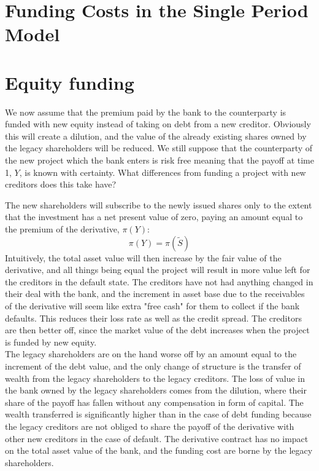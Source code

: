 \documentclass[../main.tex]{subfiles}
\begin{document}
    \section{Funding Costs in the Single Period Model}

    \section{Equity funding}
        We now assume that the premium paid by the bank to the counterparty is funded with new equity instead of taking on debt from a new creditor. Obviously this will create a dilution, and the value of the already existing shares owned by the legacy shareholders will be reduced. We still suppose that the counterparty of the new project which the bank enters is risk free meaning that the payoff at time 1, $Y$, is known with certainty. What differences from funding a project with new creditors does this take have? 

        The new shareholders will subscribe to the newly issued shares only to the extent that the investment has a net present value of zero, paying an amount equal to the premium of the derivative, $\pi(Y)$:
        \begin{equation}
            \pi(Y) = \pi(\tilde{S})
        \end{equation}
        Intuitively, the total asset value will then increase by the fair value of the derivative, and all things being equal the project will result in more value left for the creditors in the default state. The creditors have not had anything changed in their deal with the bank, and the increment in asset base due to the receivables of the derivative will seem like extra "free cash" for them to collect if the bank defaults. This reduces their loss rate as well as the credit spread. The creditors are then better off, since the market value of the debt increases when the project is funded by new equity.\\
        The legacy shareholders are on the hand worse off by an amount equal to the increment of the debt value, and the only change of structure is the transfer of wealth from the legacy shareholders to the legacy creditors. The loss of value in the bank owned by the legacy shareholders comes from the dilution, where their share of the payoff has fallen without any compensation in form of capital. The wealth transferred is significantly higher than in the case of debt funding because the legacy creditors are not obliged to share the payoff of the derivative with other new creditors in the case of default. The derivative contract has no impact on the total asset value of the bank, and the funding cost are borne by the legacy shareholders.
\end{document}
